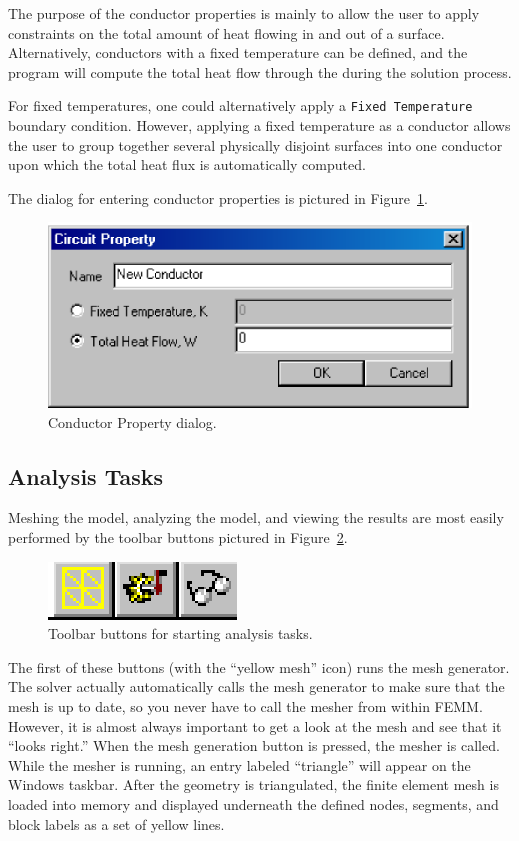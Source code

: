 The purpose of the conductor properties is mainly to allow the user to apply
constraints on the total amount of heat flowing in and out of a surface.
Alternatively, conductors with a fixed temperature can be defined, and the
program will compute the total heat flow through the during the
solution process.

For fixed temperatures, one could alternatively apply a \texttt{Fixed
Temperature} boundary condition. However, applying a fixed temperature
as a conductor allows the user to group together several physically
disjoint surfaces into one conductor upon which the total heat flux 
is automatically computed.

The dialog for entering conductor properties is pictured in
Figure~\ref{hfig12}.

\begin{figure}[htbp]
\centerline{\includegraphics{hcircprop.ps}}
\caption{Conductor Property dialog.}
\label{hfig12}
\end{figure}

\subsection{Analysis Tasks}

Meshing the model, analyzing the model, and viewing the results are
most easily performed by the toolbar buttons pictured in
Figure~\ref{hfig13}.

\begin{figure}[htbp]
\centerline{\includegraphics{belaman13.eps}}
\caption{Toolbar buttons for starting analysis tasks.}
\label{hfig13}
\end{figure}

The first of these buttons (with the ``yellow mesh'' icon) runs the
mesh generator. The solver actually automatically calls the mesh
generator to make sure that the mesh is up to date, so you never
have to call the mesher from within FEMM. However, it is almost
always important to get a look at the mesh and see that it ``looks
right.'' When the mesh generation button is pressed, the mesher is
called. While the mesher is running, an entry labeled ``triangle''
will appear on the Windows taskbar. After the geometry is
triangulated, the finite element mesh is loaded into memory and
displayed underneath the defined nodes, segments, and block labels
as a set of yellow lines.

